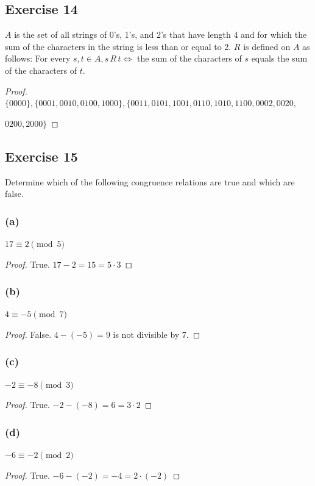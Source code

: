 \documentclass[14pt]{extarticle}
\begin{document}
\subsection{Exercise 14}
\(A\) is the set of all strings of 0’s, 1’s, and 2’s that have length 4 and for which the sum of the characters in
the string is less than or equal to 2. \(R\) is defined on \(A\) as follows: For every \(s, t \in A, s \,R\, t \iff\)
the sum of the characters of \(s\) equals the sum of the characters of \(t\).

\begin{proof}
        \(\{0000\}, \{0001, 0010, 0100, 1000\}, \{0011, 0101, 1001, 0110, 1010, 1100, 0002, 0020,\)

        \(0200, 2000\}\)
\end{proof}

\subsection{Exercise 15}
Determine which of the following congruence relations are true and which are false.

\subsubsection{(a)}
\(17 \equiv 2 \pmod 5\)
\begin{proof}
        True. \(17 - 2 = 15 = 5 \cdot 3\)
\end{proof}

\subsubsection{(b)}
\(4 \equiv -5 \pmod 7\)
\begin{proof}
        False. \(4 - (-5) = 9\) is not divisible by 7.
\end{proof}

\subsubsection{(c)}
\(-2 \equiv -8 \pmod 3\)
\begin{proof}
        True. \(-2 - (-8) = 6 = 3 \cdot 2\)
\end{proof}

\subsubsection{(d)}
\(-6 \equiv -2 \pmod 2\)
\begin{proof}
        True. \(-6 - (-2) = -4 = 2 \cdot (-2)\)
\end{proof}
\end{document}
